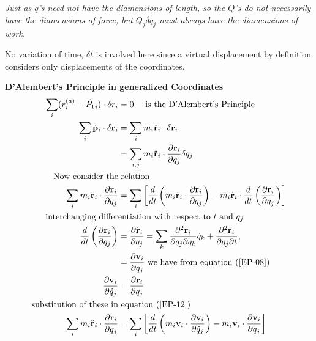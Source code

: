 \textit{Just as $q$'s need not have the diamensions of length, so the $Q$'s do not necessarily have the diamensions of force, but $Q_j\delta q_j$ must always have the diamensions of work.}
\begin{note}
	No variation of time, $\delta t$ is involved here since a virtual displacement by definition considers only displacements of the coordinates.
\end{note}
\textbf{D'Alembert's Principle in generalized Coordinates}
\begin{align}
\sum\limits_{i}(r_i^{(a)}-\dot{P_1}_i)\cdot\delta r_i&=0\text{ \quad is the D'Alembert's Principle}\notag\\
\sum_{i} \dot{\mathbf{p}}_{i} \cdot \delta \mathbf{r}_{i}&=\sum_{i} m_{i} \ddot{\mathbf{r}}_{i} \cdot \delta \mathbf{r}_{i}\notag\\
&=\sum_{i, j} m_{i} \ddot{\mathbf{r}}_{i} \cdot \frac{\partial \mathbf{r}_{i}}{\partial q_{j}} \delta q_{j}\notag\\
\text{Now consider the}&\text{ relation}\notag\\
\sum_{i} m_{i} \ddot{\mathbf{r}}_{i} \cdot \frac{\partial \mathbf{r}_{i}}{\partial q_{j}}&=\sum_{i}\left[\frac{d}{d t}\left(m_{i} \dot{\mathbf{r}}_{i} \cdot \frac{\partial \mathbf{r}_{i}}{\partial q_{j}}\right)-m_{i} \dot{\mathbf{r}}_{i} \cdot \frac{d}{d t}\left(\frac{\partial \mathbf{r}_{i}}{\partial q_{j}}\right)\right]\label{EP-12}\\
\text{interchanging differ}&\text{entiation with respect to $t$ and $q_j$}\notag\\
 \frac{d}{d t}\left(\frac{\partial \mathbf{r}_{i}}{\partial q_{j}}\right) &=\frac{\partial \dot{\mathbf{r}}_{i}}{\partial q_{j}}=\sum_{k} \frac{\partial^{2} \mathbf{r}_{i}}{\partial q_{j} \partial q_{k}} \dot{q}_{k}+\frac{\partial^{2} \mathbf{r}_{i}}{\partial q_{j} \partial t}, \notag\\
&=\frac{\partial \mathbf{v}_{i}}{\partial q_{j}}
\text{ we have from equation }(\ref{EP-08})\notag\\
\frac{\partial \mathbf{v}_{i}}{\partial \dot{q}_{j}}&=\frac{\partial \mathbf{r}_{i}}{\partial q_{j}}\label{EP-13}\\
\text{substitution of these in}&\text{ equation (\ref{EP-12})}\notag\\
\sum_{i} m_{i} \ddot{\mathbf{r}}_{i} \cdot \frac{\partial \mathbf{r}_{i}}{\partial q_{j}}&=\sum_{i}\left[\frac{d}{d t}\left(m_{i} \mathbf{v}_{i} \cdot \frac{\partial \mathbf{v}_{i}}{\partial \dot{q}_{j}}\right)-m_{i} \mathbf{v}_{i} \cdot \frac{\partial \mathbf{v}_{i}}{\partial q_{j}}\right]\notag\\

\end{align}
